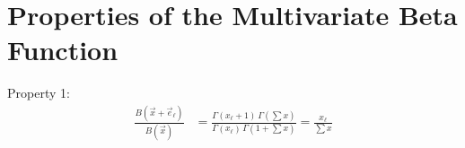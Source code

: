 \documentclass{article}
\theoremstyle{definition}
\begin{document}



\appendix
\section{Properties of the Multivariate Beta Function}

Property 1:
\begin{align*}
\frac{B(\vec x + \vec e_\ell)}{B(\vec x)}
&= \frac{\Gamma(x_\ell + 1) \, \Gamma(\sum x)}
        {\Gamma(x_\ell) \, \Gamma(1 + \sum x)}
= \frac{x_\ell}{\sum x}
\end{align*}
\end{document}
